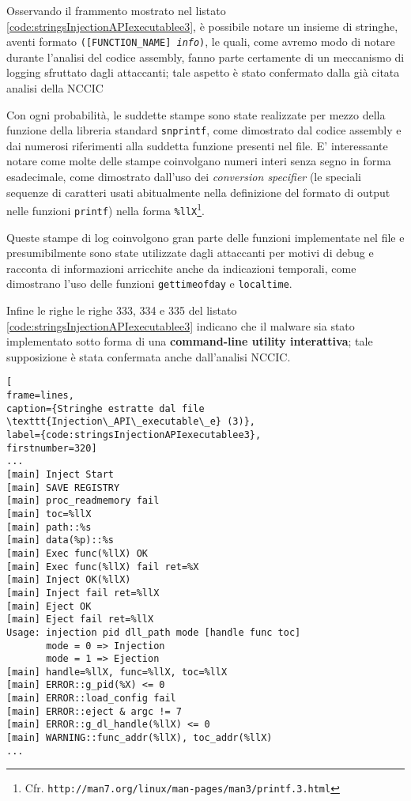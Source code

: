 \documentclass[10pt,a4paper, titlepage]{report}
\begin{document}
Osservando il frammento mostrato nel listato \ref{code:stringsInjectionAPIexecutablee3}, è possibile notare un insieme di stringhe, aventi formato \texttt{([FUNCTION\_NAME] \textit{info})}, le quali, come avremo modo di notare durante l'analisi del codice assembly, fanno parte certamente di un meccanismo di logging sfruttato dagli attaccanti; tale aspetto è stato confermato dalla già citata analisi della NCCIC

Con ogni probabilità, le suddette stampe sono state realizzate per mezzo della funzione della libreria standard \texttt{snprintf}, come dimostrato dal codice assembly e dai numerosi riferimenti alla suddetta funzione presenti nel file. E' interessante notare come molte delle stampe coinvolgano numeri interi senza segno in forma esadecimale, come dimostrato dall'uso dei \textit{conversion specifier} (le speciali sequenze di caratteri usati abitualmente nella definizione del formato di output nelle funzioni \texttt{printf}) nella forma \texttt{\%llX}\footnote{Cfr. \texttt{http://man7.org/linux/man-pages/man3/printf.3.html}}.

Queste stampe di log coinvolgono gran parte delle funzioni implementate nel file e presumibilmente sono state utilizzate dagli attaccanti per motivi di debug e racconta di informazioni arricchite anche da indicazioni temporali, come dimostrano l'uso delle funzioni \texttt{gettimeofday} e \texttt{localtime}.

Infine le righe le righe 333, 334 e 335 del listato \ref{code:stringsInjectionAPIexecutablee3} indicano che il malware sia stato implementato sotto forma di una \textbf{command-line utility interattiva}; tale supposizione è stata confermata anche dall'analisi NCCIC.

\begin{lstlisting}[
frame=lines, 
caption={Stringhe estratte dal file \texttt{Injection\_API\_executable\_e} (3)}, 
label={code:stringsInjectionAPIexecutablee3},
firstnumber=320]
...
[main] Inject Start
[main] SAVE REGISTRY
[main] proc_readmemory fail
[main] toc=%llX
[main] path::%s
[main] data(%p)::%s
[main] Exec func(%llX) OK
[main] Exec func(%llX) fail ret=%X
[main] Inject OK(%llX)
[main] Inject fail ret=%llX
[main] Eject OK
[main] Eject fail ret=%llX
Usage: injection pid dll_path mode [handle func toc]
       mode = 0 => Injection
       mode = 1 => Ejection
[main] handle=%llX, func=%llX, toc=%llX
[main] ERROR::g_pid(%X) <= 0
[main] ERROR::load_config fail
[main] ERROR::eject & argc != 7
[main] ERROR::g_dl_handle(%llX) <= 0
[main] WARNING::func_addr(%llX), toc_addr(%llX)
...
\end{lstlisting}
\end{document}
